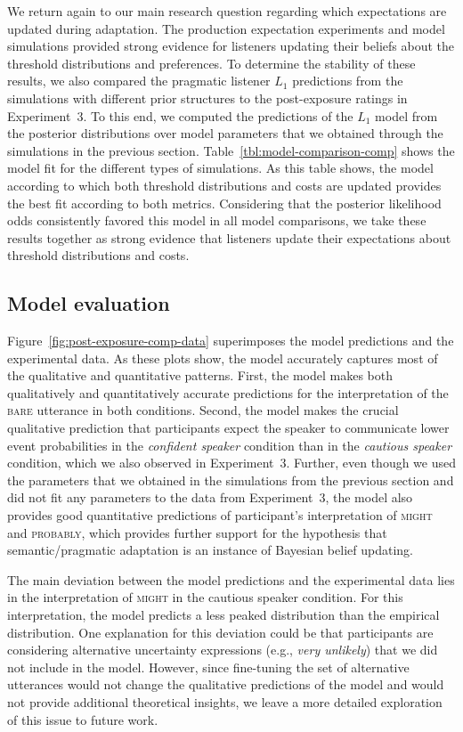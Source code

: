 \documentclass[man, floatsintext]{apa6}
\newcommand{\tableref}[1]{Table~\ref{#1}}
\newcommand{\figref}[1]{Figure~\ref{#1}}
\begin{document}
We return again to our main research question regarding which expectations are updated during adaptation. The production expectation experiments and model simulations provided strong evidence for listeners updating 
their beliefs about the threshold distributions and preferences. 
To determine the stability of these results, we also compared the pragmatic listener $L_1$ predictions from the simulations with different prior structures to the post-exposure ratings in Experiment~3. To this end, we computed the predictions of the $L_1$ model from the
posterior distributions over model parameters that we obtained through the simulations in the previous section. \tableref{tbl:model-comparison-comp} shows the model fit
for the different types of simulations. As this table shows, the model according to which both threshold distributions and costs are updated provides the best fit according to both metrics. 
Considering that the posterior likelihood odds consistently favored this model in all model comparisons, we take these results together as strong evidence that listeners update their expectations about threshold distributions
and costs. 

\subsection{Model evaluation}


\figref{fig:post-exposure-comp-data} superimposes the model predictions and the experimental data. As these plots show, the model accurately captures most of the qualitative and quantitative patterns. First, 
the model makes both qualitatively and quantitatively accurate predictions for the interpretation of the \textsc{bare} utterance in both conditions. Second, the model makes the crucial qualitative prediction that participants expect the speaker to communicate lower event probabilities in the \textit{confident speaker} condition than in the \textit{cautious speaker} condition, which we also observed in Experiment~3. Further, even though we used the parameters that we obtained in the simulations from the previous section and did not fit any parameters to the data from Experiment~3, the model also provides good quantitative predictions of participant's interpretation of \textsc{might} and \textsc{probably},
which provides further support for the hypothesis that semantic/pragmatic adaptation is an instance of Bayesian belief updating.

The main deviation between the model predictions and the experimental data lies in the interpretation of \textsc{might} in the cautious speaker condition. For this interpretation, the model predicts a less peaked distribution than the empirical distribution.  One explanation for this deviation could be that participants are considering alternative uncertainty expressions (e.g., \textit{very unlikely}) that we did not include in the model.  However, since fine-tuning the set of alternative utterances would not change the qualitative predictions of the model and would not provide additional theoretical insights, we leave a more detailed exploration of this issue to future work. 
\end{document}
